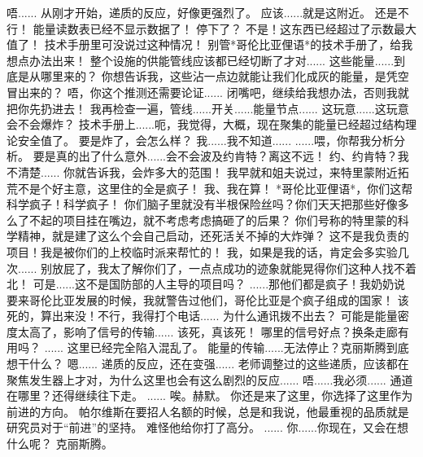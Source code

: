 \documentclass[openany]{book}
\begin{document}
\begin{dialogue}
     唔......
     从刚才开始，递质的反应，好像更强烈了。
     应该......就是这附近。
     还是不行！
     能量读数表已经不显示数据了！
     停下了？
     不是！这东西已经超过了示数最大值了！
     技术手册里可没说过这种情况！
     别管*哥伦比亚俚语*的技术手册了，给我想点办法出来！
     整个设施的供能管线应该都已经切断了才对......
     这些能量......到底是从哪里来的？
     你想告诉我，这些沾一点边就能让我们化成灰的能量，是凭空冒出来的？
     唔，你这个推测还需要论证......
     闭嘴吧，继续给我想办法，否则我就把你先扔进去！
     我再检查一遍，管线......开关......能量节点......
     这玩意......这玩意会不会爆炸？
     技术手册上......呃，我觉得，大概，现在聚集的能量已经超过结构理论安全值了。
     要是炸了，会怎么样？
     我......我不知道......
     ......喂，你帮我分析分析。
     要是真的出了什么意外......会不会波及约肯特？离这不远！
     约、约肯特？我不清楚......
     你就告诉我，会炸多大的范围！
     我早就和姐夫说过，来特里蒙附近拓荒不是个好主意，这里住的全是疯子！
     我、我在算！
     *哥伦比亚俚语*，你们这帮科学疯子！科学疯子！
     你们脑子里就没有半根保险丝吗？你们天天把那些好像多么了不起的项目挂在嘴边，就不考虑考虑搞砸了的后果？
     你们号称的特里蒙的科学精神，就是建了这么个会自己启动，还死活关不掉的大炸弹？
     这不是我负责的项目！我是被你们的上校临时派来帮忙的！
     我，如果是我的话，肯定会多实验几次......
     别放屁了，我太了解你们了，一点点成功的迹象就能晃得你们这种人找不着北！
     可是......这不是国防部的人主导的项目吗？
     ......那他们都是疯子！我奶奶说要来哥伦比亚发展的时候，我就警告过他们，哥伦比亚是个疯子组成的国家！
     该死的，算出来没！不行，我得打个电话......
     为什么通讯拨不出去？
     可能是能量密度太高了，影响了信号的传输......
     该死，真该死！
     哪里的信号好点？换条走廊有用吗？
     ......
     这里已经完全陷入混乱了。
     能量的传输......无法停止？克丽斯腾到底想干什么？
     嗯......
     递质的反应，还在变强......
     老师调整过的这些递质，应该都在聚焦发生器上才对，为什么这里也会有这么剧烈的反应......
     唔......我必须......
     通道在哪里？还得继续往下走。
     ......
     唉。赫默。
     你还是来了这里，你选择了这里作为前进的方向。
     帕尔维斯在要招人名额的时候，总是和我说，他最重视的品质就是研究员对于“前进”的坚持。
     难怪他给你打了高分。
     ......
     你......你现在，又会在想什么呢？
     克丽斯腾。
\end{dialogue}
\end{document}
